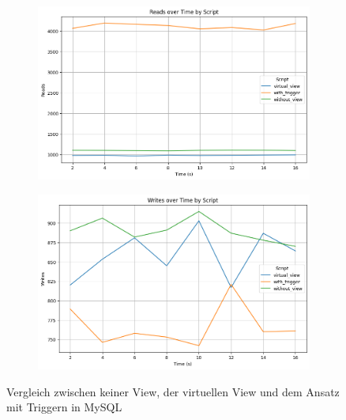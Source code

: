 \begin{figure}[H]
    \centering
    \begin{subfigure}[t]{0.48\textwidth}
        \centering
        \includegraphics[width=\textwidth]{PNGs/Script/Views/view-comparison/Reads}
        \label{view-comparison-reads}
    \end{subfigure}
    \hfill
    \begin{subfigure}[t]{0.48\textwidth}
        \centering
        \includegraphics[width=\textwidth]{PNGs/Script/Views/view-comparison/Writes}
        \label{view-comparison-writes}
    \end{subfigure}
    \vspace{-20pt}
    \caption[Views: Metrikvergleich]{Vergleich zwischen keiner View, der virtuellen View und dem Ansatz mit Triggern in MySQL}
    \label{fig:view-comparison-comp-metric}
\end{figure}
\vspace{-20pt}

